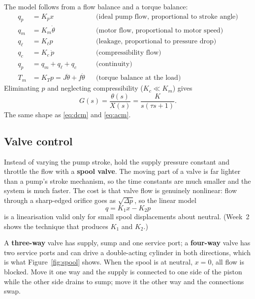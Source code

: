 \documentclass[11pt,a4paper]{article}
\begin{document}
The model follows from a flow balance and a torque balance:
\[
\begin{aligned}
  q_p &= K_p x &&\text{(ideal pump flow, proportional to stroke angle)}\\
  q_m &= K_m\dot\theta &&\text{(motor flow, proportional to motor speed)}\\
  q_\ell &= K_\ell p &&\text{(leakage, proportional to pressure drop)}\\
  q_c &= K_c\,\dot p &&\text{(compressibility flow)}\\
  q_p &= q_m+q_\ell+q_c &&\text{(continuity)}\\
  T_m &= K_T p = J\ddot\theta+f\dot\theta &&\text{(torque balance at the load)}
\end{aligned}
\]
Eliminating $p$ and neglecting compressibility ($K_c\ll K_m$) gives
\begin{equation}
  G(s)=\frac{\theta(s)}{X(s)}=\frac{K}{s(\tau s+1)} .
  \label{eq:hyd}
\end{equation}
The same shape as \eqref{eq:dcm} and \eqref{eq:acm}.

\subsection{Valve control}

Instead of varying the pump stroke, hold the supply pressure constant and
throttle the flow with a \textbf{spool valve}. The moving part of a valve is
far lighter than a pump's stroke mechanism, so the time constants are much
smaller and the system is much faster. The cost is that valve flow is
genuinely nonlinear: flow through a sharp-edged orifice goes as
$\sqrt{\Delta p}$, so the linear model
\begin{equation}
  q = K_1 x - K_2 p
  \label{eq:valve}
\end{equation}
is a linearisation valid only for small spool displacements about neutral.
(Week~2 shows the technique that produces $K_1$ and $K_2$.)

A \textbf{three-way} valve has supply, sump and one service port; a
\textbf{four-way} valve has two service ports and can drive a double-acting
cylinder in both directions, which is what Figure~\ref{fig:spool} shows. When
the spool is at neutral, $x=0$, all flow is blocked. Move it one way and the
supply is connected to one side of the piston while the other side drains to
sump; move it the other way and the connections swap.
\end{document}
